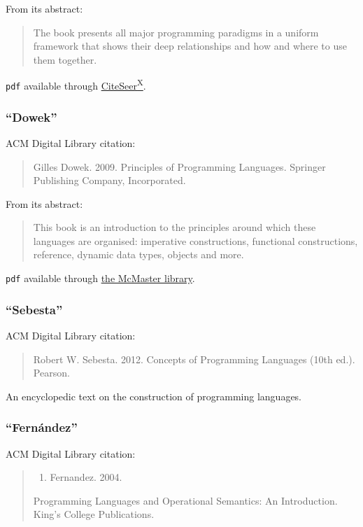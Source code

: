 \documentclass[11pt]{article}
\begin{document}
From its abstract:
\begin{quote}
The book presents all major programming paradigms in a uniform framework
that shows their deep relationships and how and where
to use them together.
\end{quote}

\texttt{pdf} available through
\href{http://citeseerx.ist.psu.edu/viewdoc/download?doi=10.1.1.102.7366\&rep=rep1\&type=pdf}{CiteSeer\textsuperscript{X}}.

\subsubsection{\textbf{“Dowek”}}
\label{sec:orgd258b0e}
ACM Digital Library citation:
\begin{quote}
Gilles Dowek. 2009.
Principles of Programming Languages.
Springer Publishing Company, Incorporated.
\end{quote}

From its abstract:
\begin{quote}
This book is an introduction to the principles
around which these languages are organised:
imperative constructions, functional constructions,
reference, dynamic data types, objects and more.
\end{quote}

\texttt{pdf} available through
\href{https://discovery.mcmaster.ca/iii/encore/record/C\_\_Rb1593967}{the McMaster library}.

\subsubsection{\textbf{“Sebesta”}}
\label{sec:org179f9ba}
ACM Digital Library citation:
\begin{quote}
Robert W. Sebesta. 2012.
Concepts of Programming Languages (10th ed.).
Pearson.
\end{quote}

An encyclopedic text on the construction of programming languages.

\subsubsection{\textbf{“Fernández”}}
\label{sec:orgfaaae3b}
ACM Digital Library citation:
\begin{quote}
\begin{enumerate}
\item Fernandez. 2004.
\end{enumerate}
Programming Languages and Operational Semantics: An Introduction.
King's College Publications.
\end{quote}
\end{document}
